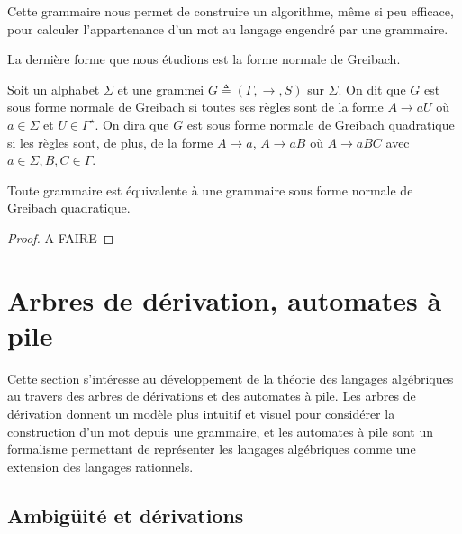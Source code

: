 \begin{remark}
  Cette grammaire nous permet de construire un algorithme, même si peu efficace,
  pour calculer l'appartenance d'un mot au langage engendré par une grammaire.
\end{remark}

La dernière forme que nous étudions est la forme normale de Greibach.

\begin{definition}
  Soit un alphabet $\Sigma$ et une grammei $G \triangleq (\Gamma,\to,S)$ sur
  $\Sigma$.
  On dit que $G$ est sous forme normale de Greibach si toutes ses règles sont
  de la forme $A \to aU$ où $a \in \Sigma$ et $U \in \Gamma^\star$. On dira que
  $G$ est sous forme normale de Greibach quadratique si les règles sont, de
  plus, de la forme $A \to a$, $A \to aB$ où $A \to aBC$ avec
  $a\in\Sigma, B,C \in \Gamma$.
\end{definition}

\begin{proposition}
  Toute grammaire est équivalente à une grammaire sous forme normale de Greibach
  quadratique.
\end{proposition}

\begin{proof}
  A FAIRE
\end{proof}

\section{Arbres de dérivation, automates à pile}

Cette section s'intéresse au développement de la théorie des langages
algébriques au travers des arbres de dérivations et des automates à pile. Les
arbres de dérivation donnent un modèle plus intuitif et visuel pour considérer
la construction d'un mot depuis une grammaire, et les automates à pile sont un
formalisme permettant de représenter les langages algébriques comme une
extension des langages rationnels.

\subsection{Ambigüité et dérivations}

